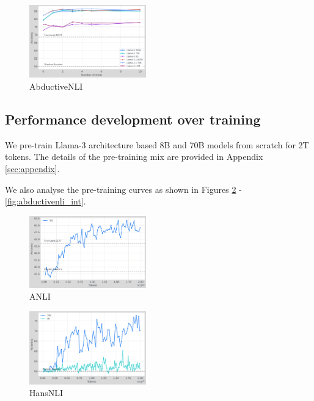 \begin{figure}[t]
    \centering
    \includegraphics[width=0.45\textwidth]{nli_plots/abductivenli.png}
    \caption{AbductiveNLI}
    \label{fig:abductivenli}
\end{figure}

\subsection{Performance development over training}

We pre-train Llama-3 architecture based 8B and 70B models from scratch for 2T tokens. The details of the pre-training mix are provided in Appendix \ref{sec:appendix}.

We also analyse the pre-training curves as shown in Figures \ref{fig:anli_int} - \ref{fig:abductivenli_int}.

\begin{figure}[t]
    \centering
    \includegraphics[width=0.45\textwidth]{nli_plots/anli_intermediate.png}
    \caption{ANLI}
    \label{fig:anli_int}
\end{figure}

\begin{figure}[t]
    \centering
    \includegraphics[width=0.45\textwidth]{nli_plots/hansnli_intermediate.png}
    \caption{HansNLI}
    \label{fig:hansnli_int}
\end{figure}

